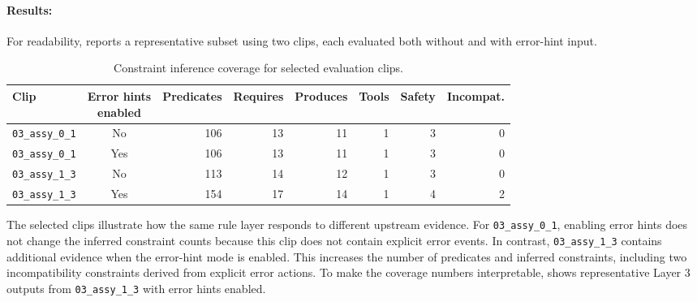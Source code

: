 \paragraph{Results:}
For readability,  reports a representative subset using
two clips, each evaluated both without and with error-hint input. 

\begin{table}[htbp]
\centering
\caption{Constraint inference coverage for selected evaluation clips.}
\label{tab:evaluation-constraint-coverage}
\small
\begin{tabular}{p{}crrrrrr}
\toprule
Clip & \makecell{Error hints\\enabled} & Predicates & Requires & Produces & Tools & Safety & Incompat. \\
\midrule
\texttt{03\_assy\_0\_1} & No  & 106 & 13 & 11 & 1 & 3 & 0 \\
\texttt{03\_assy\_0\_1} & Yes & 106 & 13 & 11 & 1 & 3 & 0 \\
\texttt{03\_assy\_1\_3} & No  & 113 & 14 & 12 & 1 & 3 & 0 \\
\texttt{03\_assy\_1\_3} & Yes & 154 & 17 & 14 & 1 & 4 & 2 \\
\bottomrule
\end{tabular}
\end{table}

The selected clips illustrate how the same rule layer responds to different upstream evidence. For \texttt{03\_assy\_0\_1}, enabling error hints does not change the inferred constraint counts because this clip does not contain explicit error events. In contrast, \texttt{03\_assy\_1\_3} contains additional evidence when the
error-hint mode is enabled. This increases the number of predicates and inferred
constraints, including two incompatibility constraints derived from explicit
error actions. To make the coverage numbers interpretable,  shows representative Layer 3 outputs from \texttt{03\_assy\_1\_3} with error hints
enabled. 


